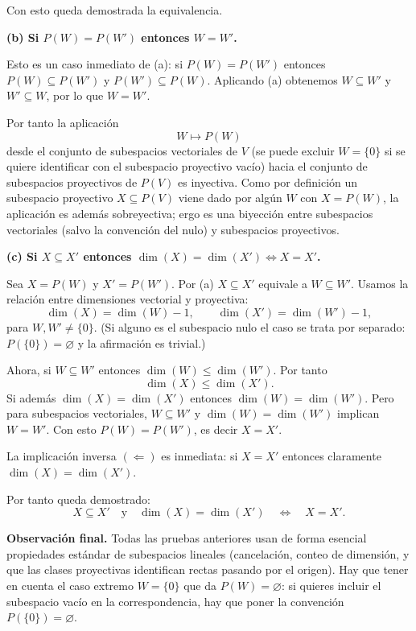 {    Con esto queda demostrada la equivalencia.

    \bigskip

    \textbf{(b) Si \(P(W)=P(W')\) entonces \(W=W'\).}

    Esto es un caso inmediato de (a): si \(P(W)=P(W')\) entonces \(P(W)\subseteq P(W')\) y \(P(W')\subseteq P(W)\). Aplicando (a) obtenemos \(W\subseteq W'\) y \(W'\subseteq W\), por lo que \(W=W'\).

    Por tanto la aplicación
    \[
    W \longmapsto P(W)
    \]
    desde el conjunto de subespacios vectoriales de \(V\) (se puede excluir \(W=\{0\}\) si se quiere identificar con el subespacio proyectivo vacío) hacia el conjunto de subespacios proyectivos de \(P(V)\) es inyectiva. Como por definición un subespacio proyectivo \(X\subseteq P(V)\) viene dado por algún \(W\) con \(X=P(W)\), la aplicación es además sobreyectiva; ergo es una biyección entre subespacios vectoriales (salvo la convención del nulo) y subespacios proyectivos.

    \bigskip

    \textbf{(c) Si \(X\subseteq X'\) entonces \(\dim(X)=\dim(X')\iff X=X'\).}

    Sea \(X=P(W)\) y \(X'=P(W')\). Por (a) \(X\subseteq X'\) equivale a \(W\subseteq W'\). Usamos la relación entre dimensiones vectorial y proyectiva:
    \[
    \dim(X)=\dim(W)-1,\qquad \dim(X')=\dim(W')-1,
    \]
    para \(W,W'\neq\{0\}\). (Si alguno es el subespacio nulo el caso se trata por separado: \(P(\{0\})=\varnothing\) y la afirmación es trivial.)

    Ahora, si \(W\subseteq W'\) entonces \(\dim(W)\le\dim(W')\). Por tanto
    \[
    \dim(X)\le\dim(X').
    \]
    Si además \(\dim(X)=\dim(X')\) entonces \(\dim(W)=\dim(W')\). Pero para subespacios vectoriales, \(W\subseteq W'\) y \(\dim(W)=\dim(W')\) implican \(W=W'\). Con esto \(P(W)=P(W')\), es decir \(X=X'\).

    La implicación inversa \((\Leftarrow)\) es inmediata: si \(X=X'\) entonces claramente \(\dim(X)=\dim(X')\).

    Por tanto queda demostrado:
    \[
    X\subseteq X'\quad\text{y}\quad\dim(X)=\dim(X')\quad\Longleftrightarrow\quad X=X'.
    \]

    \bigskip

    \textbf{Observación final.} Todas las pruebas anteriores usan de forma esencial propiedades estándar de subespacios lineales (cancelación, conteo de dimensión, y que las clases proyectivas identifican rectas pasando por el origen). Hay que tener en cuenta el caso extremo \(W=\{0\}\) que da \(P(W)=\varnothing\): si quieres incluir el subespacio vacío en la correspondencia, hay que poner la convención \(P(\{0\})=\varnothing\).


}

